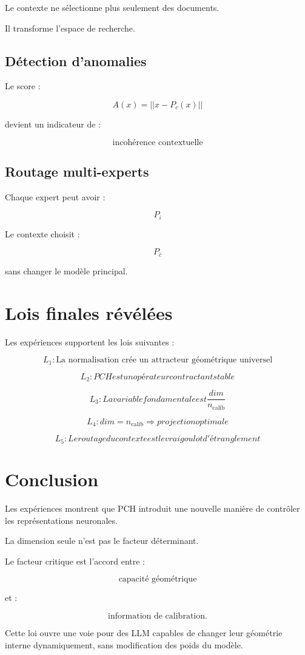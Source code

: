 \documentclass[11pt]{article}
\begin{document}
Le contexte ne sélectionne plus seulement des documents.

Il transforme l'espace de recherche.


\subsection{Détection d'anomalies}


Le score :

\[
A(x)=||x-P_c(x)||
\]


devient un indicateur de :

\[
\text{incohérence contextuelle}
\]


\subsection{Routage multi-experts}


Chaque expert peut avoir :

\[
P_i
\]


Le contexte choisit :

\[
P_{\hat c}
\]


sans changer le modèle principal.


\section{Lois finales révélées}


Les expériences supportent les lois suivantes :


\[
\boxed{
L_1:
\text{La normalisation crée un attracteur géométrique universel}
}
\]


\[
\boxed{
L_2:
PCH est un opérateur contractant stable
}
\]


\[
\boxed{
L_3:
La variable fondamentale est }
\frac{dim}{n_{\mathrm{calib}}}
\]


\[
\boxed{
L_4:
dim=n_{\mathrm{calib}}
\Rightarrow
projection optimale
}
\]


\[
\boxed{
L_5:
Le routage du contexte est le vrai goulot d'étranglement
}
\]


\section{Conclusion}


Les expériences montrent que PCH introduit une nouvelle manière
de contrôler les représentations neuronales.

La dimension seule n'est pas le facteur déterminant.

Le facteur critique est l'accord entre :

\[
\text{capacité géométrique}
\]

et :

\[
\text{information de calibration}.
\]


Cette loi ouvre une voie pour des LLM capables de changer
leur géométrie interne dynamiquement,
sans modification des poids du modèle.
\end{document}

